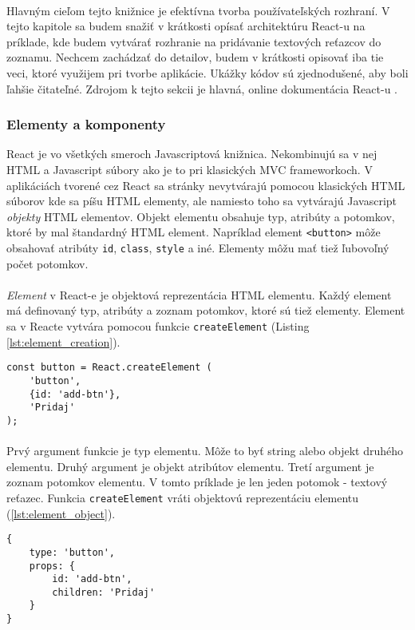 \paragraph{}
Hlavným cieľom tejto knižnice je efektívna tvorba používateľských rozhraní. V tejto kapitole sa budem snažiť v krátkosti opísať architektúru React-u na príklade, kde budem vytvárať rozhranie na pridávanie textových reťazcov do zoznamu. Nechcem zachádzať do detailov, budem v krátkosti opisovať iba tie veci, ktoré využijem pri tvorbe aplikácie. Ukážky kódov sú zjednodušené, aby boli ľahšie čitateľné. Zdrojom k tejto sekcii je hlavná, online dokumentácia React-u \cite{man:react}.

\subsubsection{Elementy a komponenty}
React je vo všetkých smeroch Javascriptová knižnica. Nekombinujú sa v nej HTML a Javascript súbory ako je to pri klasických MVC frameworkoch. V aplikáciách tvorené cez React sa stránky nevytvárajú pomocou klasických HTML súborov kde sa píšu HTML elementy, ale namiesto toho sa vytvárajú Javascript \emph{objekty} HTML elementov. Objekt elementu obsahuje typ, atribúty a potomkov, ktoré by mal štandardný HTML element. Napríklad element \texttt{<button>} môže obsahovať atribúty \texttt{id}, \texttt{class}, \texttt{style} a iné. Elementy môžu mať tiež ľubovoľný počet potomkov.
\paragraph{}
\emph{Element} v React-e je objektová reprezentácia HTML elementu. Každý element má definovaný typ, atribúty a zoznam potomkov, ktoré sú tiež elementy. Element sa v Reacte vytvára pomocou funkcie \texttt{createElement} (Listing \ref{lst:element_creation}).
\begin{lstlisting}[caption={Vytvorenie jednoduchého elementu}, label={lst:element_creation}]
const button = React.createElement (
    'button',
    {id: 'add-btn'},
    'Pridaj'
);
\end{lstlisting}
\paragraph{}
Prvý argument funkcie je typ elementu. Môže to byť string alebo objekt druhého elementu. Druhý argument je objekt atribútov elementu. Tretí argument je zoznam potomkov elementu. V tomto príklade je len jeden potomok - textový reťazec. Funkcia \texttt{createElement} vráti objektovú reprezentáciu elementu (\ref{lst:element_object}).
\begin{lstlisting}[caption={Objektová reprezentácia elementu}, label={lst:element_object}]
{
    type: 'button',
    props: {
        id: 'add-btn',
        children: 'Pridaj'
    }
}
\end{lstlisting}
